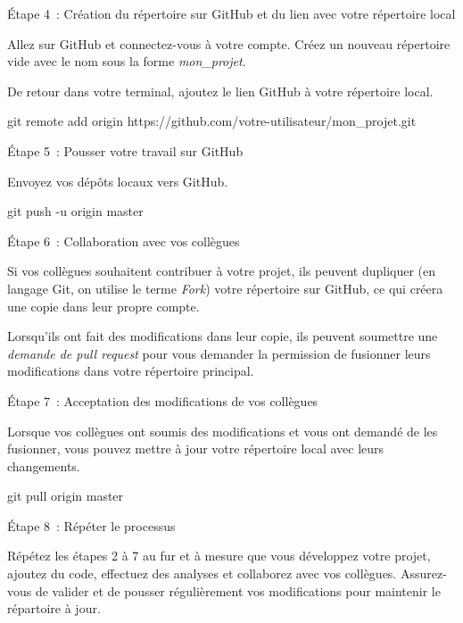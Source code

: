 \documentclass[
  letterpaper,
  DIV=11,
  numbers=noendperiod]{scrreprt}
\newenvironment{Shaded}{\begin{snugshade}}{\end{snugshade}}
\newcommand{\AttributeTok}[1]{\textcolor[rgb]{0.40,0.45,0.13}{#1}}
\newcommand{\FunctionTok}[1]{\textcolor[rgb]{0.28,0.35,0.67}{#1}}
\newcommand{\NormalTok}[1]{\textcolor[rgb]{0.00,0.23,0.31}{#1}}
\begin{document}
Étape 4~: Création du répertoire sur GitHub et du lien avec votre
répertoire local

Allez sur GitHub et connectez-vous à votre compte. Créez un nouveau
répertoire vide avec le nom sous la forme \emph{mon\_projet}.

De retour dans votre terminal, ajoutez le lien GitHub à votre répertoire
local.

\begin{Shaded}
\begin{Highlighting}[]
\FunctionTok{git}\NormalTok{ remote add origin https://github.com/votre{-}utilisateur/mon\_projet.git}
\end{Highlighting}
\end{Shaded}

Étape 5~: Pousser votre travail sur GitHub

Envoyez vos dépôts locaux vers GitHub.

\begin{Shaded}
\begin{Highlighting}[]
\FunctionTok{git}\NormalTok{ push }\AttributeTok{{-}u}\NormalTok{ origin master}
\end{Highlighting}
\end{Shaded}

Étape 6~: Collaboration avec vos collègues

Si vos collègues souhaitent contribuer à votre projet, ils peuvent
dupliquer (en langage Git, on utilise le terme \emph{Fork}) votre
répertoire sur GitHub, ce qui créera une copie dans leur propre compte.

Lorsqu'ils ont fait des modifications dans leur copie, ils peuvent
soumettre une \emph{demande de pull request} pour vous demander la
permission de fusionner leurs modifications dans votre répertoire
principal.

Étape 7~: Acceptation des modifications de vos collègues

Lorsque vos collègues ont soumis des modifications et vous ont demandé
de les fusionner, vous pouvez mettre à jour votre répertoire local avec
leurs changements.

\begin{Shaded}
\begin{Highlighting}[]
\FunctionTok{git}\NormalTok{ pull origin master}
\end{Highlighting}
\end{Shaded}

Étape 8~: Répéter le processus

Répétez les étapes 2 à 7 au fur et à mesure que vous développez votre
projet, ajoutez du code, effectuez des analyses et collaborez avec vos
collègues. Assurez-vous de valider et de pousser régulièrement vos
modifications pour maintenir le répartoire à jour.
\end{document}
